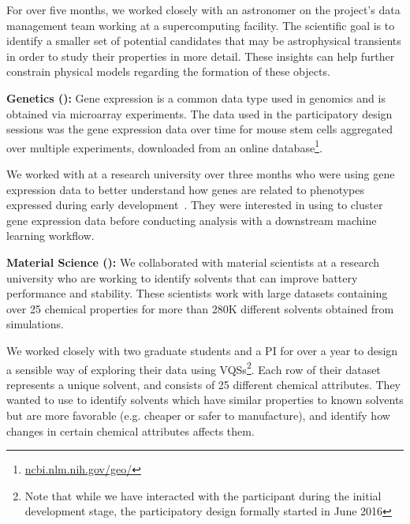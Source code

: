 For over five months, we worked closely with an astronomer on the project's data management team working at a supercomputing facility.  The scientific goal is to identify a smaller set of potential candidates that may be astrophysical transients in order to study their properties in more detail. These insights can help further constrain physical models regarding the formation of these objects.
\par \textbf{Genetics (\bio):} Gene expression is a common data type used in genomics and is obtained via microarray experiments.  The data used in the participatory design sessions was the gene expression data over time for mouse stem cells aggregated over multiple experiments, downloaded from an online database\footnote{\url{ncbi.nlm.nih.gov/geo/}}. 
\par  We worked with  at a research university over three months who were using gene expression data to better understand how genes are related to phenotypes expressed during early development~\cite{Peng2016,Gloss084442}. They were interested in using \zv to cluster gene expression data before conducting analysis with a downstream machine learning workflow. 
\par \textbf{Material Science (\matsci):} We collaborated with material scientists at a research university who are working to identify solvents that can improve battery performance and stability. These scientists work with large datasets containing over 25 chemical properties for more than 280K different solvents obtained from simulations. 
\par We worked closely with two graduate students and a PI for over a year to design a sensible way of exploring their data using VQSs\footnote{Note that while we have interacted with the \matsci participant during the initial development stage, the participatory design formally started in June 2016}. Each row of their dataset represents a unique solvent, and consists of 25 different chemical attributes. They wanted to use \zv to identify solvents which have similar properties to known solvents but are more favorable (e.g. cheaper or safer to manufacture), and identify how changes in certain chemical attributes affects them.
\raggedbottom

